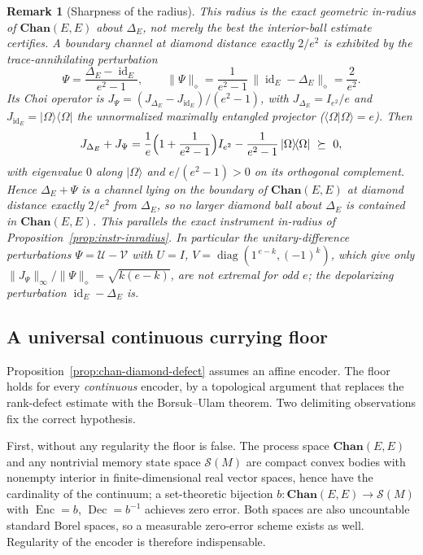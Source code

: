 \documentclass[11pt]{article}
\newtheorem{remark}[theorem]{Remark}
\DeclareMathOperator{\id}{id}
\DeclareMathOperator{\diag}{diag}
\begin{document}
\begin{remark}[Sharpness of the radius]
This radius is the exact geometric in-radius of $\mathbf{Chan}(E,E)$
about $\Delta_E$, not merely the best the interior-ball estimate certifies. A
boundary channel at diamond distance exactly $2/e^2$ is exhibited by the
trace-annihilating perturbation
\[
\Psi=\frac{\Delta_E-\id_E}{e^2-1},
\qquad
\|\Psi\|_\diamond=\frac{1}{e^2-1}\,\|\id_E-\Delta_E\|_\diamond=\frac{2}{e^2}.
\]
Its Choi operator is $J_\Psi=(J_{\Delta_E}-J_{\id_E})/(e^2-1)$, with
$J_{\Delta_E}=I_{e^2}/e$ and $J_{\id_E}=|\Omega\rangle\!\langle\Omega|$ the
unnormalized maximally entangled projector ($\langle\Omega|\Omega\rangle=e$).
Then
\[
J_{\Delta_E}+J_\Psi
=\frac1e\Bigl(1+\frac1{e^2-1}\Bigr)I_{e^2}
-\frac{1}{e^2-1}\,|\Omega\rangle\!\langle\Omega|
\ \succeq\ 0,
\]
with eigenvalue $0$ along $|\Omega\rangle$ and $e/(e^2-1)>0$ on its orthogonal
complement. Hence $\Delta_E+\Psi$ is a channel lying on the boundary of
$\mathbf{Chan}(E,E)$ at diamond distance exactly $2/e^2$ from $\Delta_E$, so no
larger diamond ball about $\Delta_E$ is contained in $\mathbf{Chan}(E,E)$. This
parallels the exact instrument in-radius of
Proposition~\ref{prop:instr-inradius}. In
particular the unitary-difference perturbations
$\Psi=\mathcal U-\mathcal V$ with $U=I$, $V=\diag(1^{\,e-k},(-1)^{k})$, which
give only $\|J_\Psi\|_\infty/\|\Psi\|_\diamond=\sqrt{k(e-k)}$, are not extremal
for odd $e$; the depolarizing perturbation $\id_E-\Delta_E$ is.
\end{remark}

\subsection{A universal continuous currying floor}

Proposition~\ref{prop:chan-diamond-defect} assumes an affine encoder. The floor
holds for every \emph{continuous} encoder, by a topological argument
that replaces the rank-defect estimate with the Borsuk--Ulam theorem. Two
delimiting observations fix the correct hypothesis.

First, without any regularity the floor is false. The process space
$\mathbf{Chan}(E,E)$ and any nontrivial memory state space $\mathcal S(M)$ are
compact convex bodies with nonempty interior in finite-dimensional real vector
spaces, hence have the cardinality of the continuum; a set-theoretic bijection
$b:\mathbf{Chan}(E,E)\to\mathcal S(M)$ with $\operatorname{Enc}=b$,
$\operatorname{Dec}=b^{-1}$ achieves zero error. Both spaces are also
uncountable standard Borel spaces, so a measurable zero-error scheme exists as
well. Regularity of the encoder is therefore indispensable.
\end{document}

